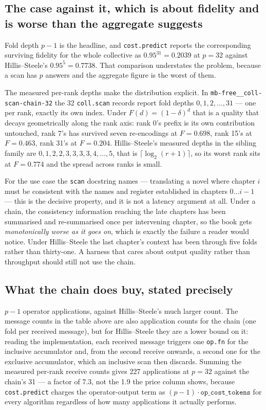 \documentclass[11pt]{article}
\begin{document}
\subsection{The case against it, which is about fidelity and is worse than the aggregate suggests}

Fold depth $p-1$ is the headline, and \texttt{cost.predict} reports the corresponding surviving
fidelity for the whole collective as $0.95^{31} = 0.2039$ at $p=32$ against Hillis--Steele's
$0.95^5 = 0.7738$. That comparison understates the problem, because a scan has $p$ answers and the
aggregate figure is the worst of them.

The measured per-rank depths make the distribution explicit. In
\texttt{mb-free\_\_coll-scan-chain-32} the 32 \texttt{coll.scan} records report fold depths
$0, 1, 2, \ldots, 31$ --- one per rank, exactly its own index. Under $F(d) = (1-\delta)^d$ that is
a quality that decays geometrically along the rank axis: rank 0's prefix is its own contribution
untouched, rank 7's has survived seven re-encodings at $F = 0.698$, rank 15's at $F = 0.463$, rank
31's at $F = 0.204$. Hillis--Steele's measured depths in the sibling family are
$0, 1, 2, 2, 3, 3, 3, 3, 4, \ldots, 5$, that is $\lceil\log_2(r+1)\rceil$, so its worst rank sits
at $F = 0.774$ and the spread across ranks is small.

For the use case the \texttt{scan} docstring names --- translating a novel where chapter $i$ must
be consistent with the names and register established in chapters $0 \ldots i-1$ --- this is the
decisive property, and it is not a latency argument at all. Under a chain, the consistency
information reaching the late chapters has been summarised and re-summarised once per intervening
chapter, so the book gets \emph{monotonically worse as it goes on}, which is exactly the failure a
reader would notice. Under Hillis--Steele the last chapter's context has been through five folds
rather than thirty-one. A harness that cares about output quality rather than throughput should
still not use the chain.

\subsection{What the chain does buy, stated precisely}

$p-1$ operator applications, against Hillis--Steele's much larger count. The message counts in the
table above are also application counts for the chain (one fold per received message), but for
Hillis--Steele they are a lower bound on it: reading the implementation, each received message
triggers one \texttt{op.fn} for the inclusive accumulator and, from the second receive onwards, a
second one for the exclusive accumulator, which an inclusive scan then discards. Summing the
measured per-rank receive counts gives 227 applications at $p=32$ against the chain's 31 --- a
factor of 7.3, not the 1.9 the price column shows, because \texttt{cost.predict} charges the
operator-output term as $(p-1) \cdot \texttt{op\_cost\_tokens}$ for every algorithm regardless of
how many applications it actually performs.
\end{document}
